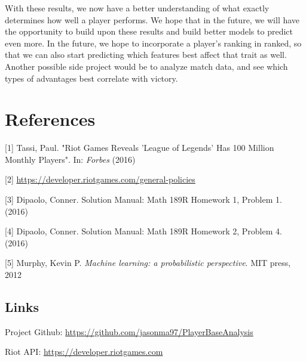 \documentclass{article}
\begin{document}
	With these results, we now have a better understanding of what exactly determines how well a player performs. We hope that in the future, we will have the opportunity to build upon these results and build better models to predict even more. In the future, we hope to incorporate a player's ranking in ranked, so that we can also start predicting which features best affect that trait as well. Another possible side project would be to analyze match data, and see which types of advantages best correlate with victory.
	
	\section{References}
	[1] Tassi, Paul.  "Riot Games Reveals 'League of Legends' Has 100 Million Monthly Players".  In: \textit{Forbes} (2016)
	
	[2] \url{https://developer.riotgames.com/general-policies}
	
	
	[3] Dipaolo, Conner. Solution Manual: Math 189R Homework 1, Problem 1. (2016)
	
	[4] Dipaolo, Conner. Solution Manual: Math 189R Homework 2, Problem 4. (2016) 
	
	[5] Murphy, Kevin P. \textit{Machine learning: a probabilistic perspective}. MIT press, 2012
	
	\subsection{Links}
	Project Github: \url{https://github.com/jasonma97/PlayerBaseAnalysis}
	
	Riot API: \url{https://developer.riotgames.com}
	
\end{document}
